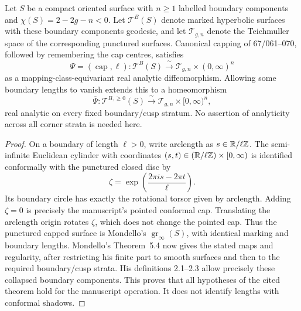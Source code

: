 \begin{theorem}\label{A:grafting}
Let $S$ be a compact oriented surface with $n\geq1$ labelled boundary
components and $\chi(S)=2-2g-n<0$. Let $\mathcal T^B(S)$ denote marked
hyperbolic surfaces with these boundary components geodesic, and let
$\mathcal T_{g,n}$ denote the Teichmuller space of the corresponding
punctured surfaces. Canonical capping of 67/061--070, followed by
remembering the cap centres, satisfies
\[
 \Psi=(\operatorname{cap},\ell):\mathcal T^B(S)
 \xrightarrow{\ \sim\ }\mathcal T_{g,n}\times(0,\infty)^n
\]
as a mapping-class-equivariant real analytic diffeomorphism. Allowing
some boundary lengths to vanish extends this to a homeomorphism
\[
 \overline\Psi:\mathcal T^{B,\geq0}(S)
 \xrightarrow{\ \sim\ }\mathcal T_{g,n}\times[0,\infty)^n,
\]
real analytic on every fixed boundary/cusp stratum. No assertion of
analyticity across all corner strata is needed here.
\end{theorem}
\begin{proof}
On a boundary of length $\ell>0$, write arclength as
$s\in{\mathbb{R}}/\ell{\mathbb{Z}}$. The semi-infinite Euclidean cylinder with coordinates
$(s,t)\in({\mathbb{R}}/\ell{\mathbb{Z}})\times[0,\infty)$ is identified conformally with
the punctured closed disc by
\[
 \zeta=\exp\!\left(\frac{2\pi i s-2\pi t}{\ell}\right).
\]
Its boundary circle has exactly the rotational torsor given by
arclength. Adding $\zeta=0$ is precisely the manuscript's pointed
conformal cap. Translating the arclength origin rotates $\zeta$,
which does not change the pointed cap. Thus the punctured capped
surface is Mondello's $\operatorname{gr}_\infty(S)$, with identical
marking and boundary lengths. Mondello's Theorem~5.4 \citep[p.~660]{C_Mondello2011} now gives the
stated maps and regularity, after restricting his finite part to
smooth surfaces and then to the required boundary/cusp strata.
His definitions 2.1--2.3 allow precisely these collapsed boundary
components. This proves that all hypotheses of the cited theorem
hold for the manuscript operation. It does not identify lengths with
conformal shadows.
\end{proof}




